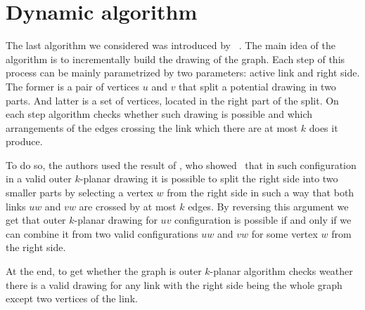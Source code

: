 
\section{Dynamic algorithm}

The last algorithm we considered was introduced by \citeauthor{okp}~\cite{okp}. The main idea of the algorithm is to incrementally build the drawing of the graph. Each step of this process can be mainly parametrized by two parameters: active link and right side. The former is a pair of vertices \(u\) and \(v\) that split a potential drawing in two parts. And latter is a set of vertices, located in the right part of the split. On each step algorithm checks whether such drawing is possible and which arrangements of the edges crossing the link which there are at most \(k\) does it produce.

To do so, the authors used the result of \citeauthor{triangulations}, who showed~\cite{triangulations} that in such configuration in a valid outer \(k\)-planar drawing it is possible to split the right side into two smaller parts by selecting a vertex \(w\) from the right side in such a way that both links \(uw\) and \(vw\) are crossed by at most \(k\) edges. By reversing this argument we get that outer \(k\)-planar drawing for \(uv\) configuration is possible if and only if we can combine it from two valid configurations \(uw\) and \(vw\) for some vertex \(w\) from the right side.

At the end, to get whether the graph is outer \(k\)-planar algorithm checks weather there is a valid drawing for any link with the right side being the whole graph except two vertices of the link.
